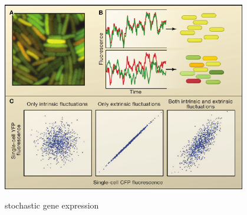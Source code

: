 \begin{frame}
\begin{center}
\includegraphics[width=0.8\textwidth]{fig/rajvOf1.pdf}\\
\hfill \cite{Raj2008a}
\end{center}
stochastic gene expression
\end{frame}

